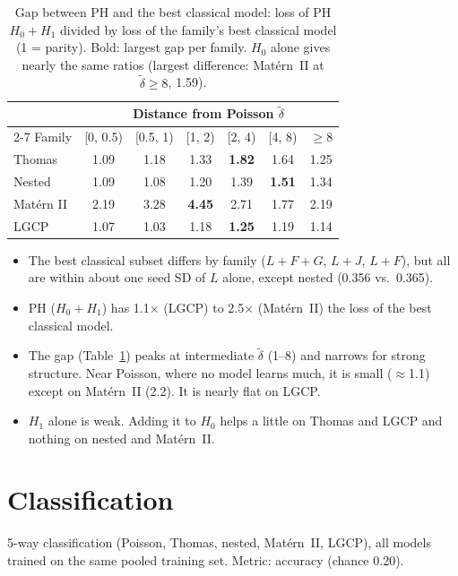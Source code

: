 \documentclass[10pt,a4paper]{article}
\newcommand{\dtil}{\tilde\delta}
\newcommand{\B}[1]{\textbf{#1}}
\begin{document}
\begin{table}[H]
\centering\small
\begin{tabular}{@{}l cccccc@{}}
\toprule
 & \multicolumn{6}{c}{Distance from Poisson $\dtil$}\\
\cmidrule(l){2-7}
Family & [0, 0.5) & [0.5, 1) & [1, 2) & [2, 4) & [4, 8) & $\ge 8$\\
\midrule
Thomas & 1.09 & 1.18 & 1.33 & \B{1.82} & 1.64 & 1.25\\
Nested & 1.09 & 1.08 & 1.20 & 1.39 & \B{1.51} & 1.34\\
Mat\'ern II & 2.19 & 3.28 & \B{4.45} & 2.71 & 1.77 & 2.19\\
LGCP & 1.07 & 1.03 & 1.18 & \B{1.25} & 1.19 & 1.14\\
\bottomrule
\end{tabular}
\caption{Gap between PH and the best classical model: loss of PH $H_0{+}H_1$ divided by loss of the family's best classical model (1 = parity). Bold: largest gap per family. $H_0$ alone gives nearly the same ratios (largest difference: Mat\'ern~II at $\dtil \ge 8$, 1.59).}
\label{tab:params-gap}
\end{table}

\begin{itemize}
  \item The best classical subset differs by family ($L{+}F{+}G$, $L{+}J$, $L{+}F$), but all are within about one seed SD of $L$ alone, except nested (0.356 vs.\ 0.365).
  \item PH ($H_0{+}H_1$) has 1.1$\times$ (LGCP) to 2.5$\times$ (Mat\'ern~II) the loss of the best classical model.
  \item The gap (Table~\ref{tab:params-gap}) peaks at intermediate $\dtil$ (1--8) and narrows for strong structure. Near Poisson, where no model learns much, it is small ($\approx$1.1) except on Mat\'ern~II (2.2). It is nearly flat on LGCP.
  \item $H_1$ alone is weak. Adding it to $H_0$ helps a little on Thomas and LGCP and nothing on nested and Mat\'ern~II.
\end{itemize}

\section{Classification}

5-way classification (Poisson, Thomas, nested, Mat\'ern~II, LGCP), all models trained on the same pooled training set. Metric: accuracy (chance 0.20).
\end{document}
